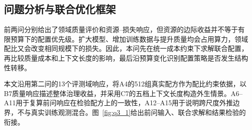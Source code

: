 \documentclass[bwprint]{gmcmthesis}
\begin{document}
\subsection{问题分析与联合优化框架}

前两问分别给出了领域质量评价和资源--损失响应，但资源的边际收益并不等于有限预算下的配置优先级。扩大模型、增加训练数据与提升质量均会占用算力，领域配比又会改变相同规模下的损失。因此，本问先在统一成本约束下求解联合配置，再比较质量成本和上下文长度的影响，最后沿预算变化识别配置策略是否发生结构性转移。

本文沿用第二问的13个评测域响应，将A4的512组真实配方作为配比约束依据，以B7质量响应描述整体治理收益，并采用C7的五档上下文长度构造外生情景。A6--A11用于复算前问响应在检验配方上的一致性，A12--A15用于说明跨尺度外推边界，不与真实训练观测混合。图~\ref{fig:q3_1}给出前问输入、联合求解和结果检验的衔接。
\end{document}
